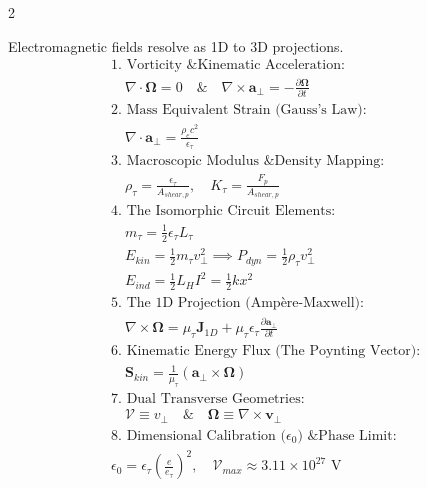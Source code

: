 \begin{multicols}{2}
\begin{tcolorbox}[cheatbox, title={\refstepcounter{cheatnum}\label{box:em_lc_isomorphism}\thecheatnum. The LC-Acoustic Isomorphism \scriptsize\hfill\hyperref[sec:deriv_em_lc_isomorphism]{[Proof $\downarrow$]}}]
Electromagnetic fields resolve as 1D to 3D projections.
\begin{align}
    &\text{1. Vorticity \& Kinematic Acceleration:} \nonumber \\
    &\quad \nabla \cdot \boldsymbol{\Omega} = 0 \quad \text{\&} \quad \nabla \times \mathbf{a}_\perp = -\frac{\partial \boldsymbol{\Omega}}{\partial t} \label{eq:maxwell_gauss_faraday} \\
    &\text{2. Mass Equivalent Strain (Gauss's Law):} \nonumber \\
    &\quad \nabla \cdot \mathbf{a}_\perp = \frac{\rho_e c^2}{\epsilon_{\tau}} \label{eq:maxwell_gaussE} \\
    &\text{3. Macroscopic Modulus \& Density Mapping:} \nonumber \\
    &\quad \rho_{\tau} = \frac{\epsilon_{\tau}}{A_{shear, p}}, \quad K_\tau = \frac{F_p}{A_{shear, p}} \label{eq:lc_constants} \\
    &\text{4. The Isomorphic Circuit Elements:} \nonumber \\
    &\quad m_\tau = \frac{1}{2} \epsilon_{\tau} L_\tau \label{eq:lc_mass} \\
    &\quad E_{kin} = \frac{1}{2} m_{\tau} v_{\perp}^2 \implies P_{dyn} = \frac{1}{2}\rho_{\tau} v_{\perp}^2 \label{eq:velocity_pressure} \\
    &\quad E_{ind} = \frac{1}{2} L_H I^2 = \frac{1}{2} k x^2 \label{eq:lc_inductance} \\
    &\text{5. The 1D Projection (Ampère-Maxwell):} \nonumber \\
    &\quad \nabla \times \boldsymbol{\Omega} = \mu_{\tau} \mathbf{J}_{1D} + \mu_{\tau} \epsilon_{\tau} \frac{\partial \mathbf{a}_\perp}{\partial t} \label{eq:maxwell_curlB} \\
    &\text{6. Kinematic Energy Flux (The Poynting Vector):} \nonumber \\
    &\quad \mathbf{S}_{kin} = \frac{1}{\mu_{\tau}} (\mathbf{a}_\perp \times \boldsymbol{\Omega}) \label{eq:poynting_flux} \\
    &\text{7. Dual Transverse Geometries:} \nonumber \\
    &\quad \mathcal{V} \equiv v_{\perp} \quad \text{\&} \quad \boldsymbol{\Omega} \equiv \nabla \times \mathbf{v}_{\perp}  \label{eq:dual_transverse} \\
    &\text{8. Dimensional Calibration ($\epsilon_0$) \& Phase Limit:} \nonumber \\
    &\epsilon_0 = \epsilon_{\tau} \left( \frac{e}{e_{\tau}} \right)^2,
    \quad \mathcal{V}_{max} \approx 3.11 \times 10^{27} \text{ V} \label{eq:epsilon_0_derivation}
\end{align}
\end{tcolorbox}


\end{multicols}
